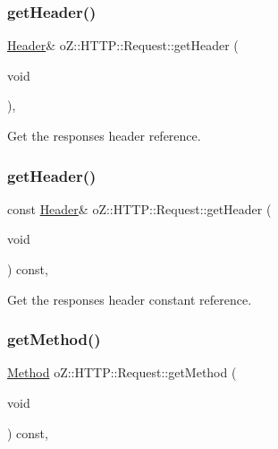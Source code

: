 \subsubsection{\texorpdfstring{getHeader()}{getHeader()}\hspace{0.1cm}{\footnotesize\ttfamily [1/2]}}
{\footnotesize\ttfamily \mbox{\hyperlink{classo_z_1_1_h_t_t_p_1_1_header}{Header}}\& o\+Z\+::\+H\+T\+T\+P\+::\+Request\+::get\+Header (\begin{DoxyParamCaption}\item[{void}]{ }\end{DoxyParamCaption})\hspace{0.3cm}{\ttfamily [inline]}, {\ttfamily [noexcept]}}



Get the response\textquotesingle{}s header reference. 

\mbox{\label{classo_z_1_1_h_t_t_p_1_1_request_af30ec4512061e7953483954f90cba215}} 
\subsubsection{\texorpdfstring{getHeader()}{getHeader()}\hspace{0.1cm}{\footnotesize\ttfamily [2/2]}}
{\footnotesize\ttfamily const \mbox{\hyperlink{classo_z_1_1_h_t_t_p_1_1_header}{Header}}\& o\+Z\+::\+H\+T\+T\+P\+::\+Request\+::get\+Header (\begin{DoxyParamCaption}\item[{void}]{ }\end{DoxyParamCaption}) const\hspace{0.3cm}{\ttfamily [inline]}, {\ttfamily [noexcept]}}



Get the response\textquotesingle{}s header constant reference. 

\mbox{\label{classo_z_1_1_h_t_t_p_1_1_request_ab8c06f60e7d3b17c2ad03c7b9cb046d7}} 
\subsubsection{\texorpdfstring{getMethod()}{getMethod()}}
{\footnotesize\ttfamily \mbox{\hyperlink{namespaceo_z_1_1_h_t_t_p_a02d8497e4abbb0adf3af0fe9fad1b7a6}{Method}} o\+Z\+::\+H\+T\+T\+P\+::\+Request\+::get\+Method (\begin{DoxyParamCaption}\item[{void}]{ }\end{DoxyParamCaption}) const\hspace{0.3cm}{\ttfamily [inline]}, {\ttfamily [noexcept]}}



